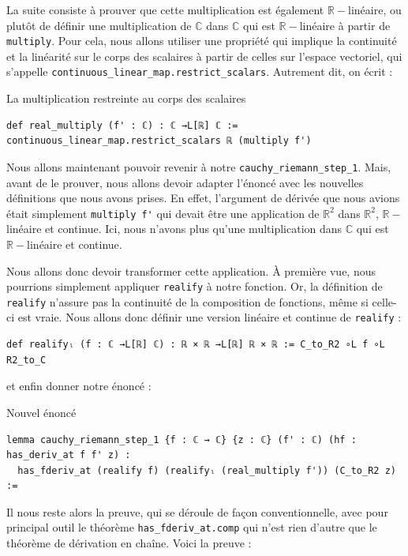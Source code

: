\documentclass[a4paper, 11pt, twoside]{report}
\newcommand\R{\mathbb{R}}
\newcommand\C{\mathbb{C}}
\begin{document}
La suite consiste à prouver que cette multiplication est également $\R-$linéaire, ou plutôt de définir une multiplication de $\C$ dans $\C$ qui est $\R-$linéaire à partir de \verb|multiply|. Pour cela, nous allons utiliser une propriété qui implique la continuité et la linéarité sur le corps des scalaires à partir de celles sur l'espace vectoriel, qui s'appelle \verb|continuous_linear_map.restrict_scalars|. Autrement dit, on écrit :

\begin{code}{La multiplication restreinte au corps des scalaires}
\begin{lstlisting}
def real_multiply (f' : ℂ) : ℂ →L[ℝ] ℂ :=
continuous_linear_map.restrict_scalars ℝ (multiply f')
\end{lstlisting}
\end{code}

\bigskip

Nous allons maintenant pouvoir revenir à notre \verb|cauchy_riemann_step_1|. Mais, avant de le prouver, nous allons devoir adapter l'énoncé avec les nouvelles définitions que nous avons prises. En effet, l'argument de dérivée que nous avions était simplement \verb|multiply f'| qui devait être une application de $\R^2$ dans $\R^2$, $\R-$linéaire et continue. Ici, nous n'avons plus qu'une multiplication dans $\C$ qui est $\R-$linéaire et continue.

Nous allons donc devoir transformer cette application. À première vue, nous pourrions simplement appliquer \verb|realify| à notre fonction. Or, la définition de \verb|realify| n'assure pas la continuité de la composition de fonctions, même si celle-ci est vraie. Nous allons donc définir une version linéaire et continue de \verb|realify| :

\begin{lstlisting}
def realifyₗ (f : ℂ →L[ℝ] ℂ) : ℝ × ℝ →L[ℝ] ℝ × ℝ := C_to_R2 ∘L f ∘L R2_to_C
\end{lstlisting}

et enfin donner notre énoncé :

\begin{code}{Nouvel énoncé}
\begin{lstlisting}
lemma cauchy_riemann_step_1 {f : ℂ → ℂ} {z : ℂ} (f' : ℂ) (hf : has_deriv_at f f' z) : 
  has_fderiv_at (realify f) (realifyₗ (real_multiply f')) (C_to_R2 z) := 
\end{lstlisting}
\end{code}

Il nous reste alors la preuve, qui se déroule de façon conventionnelle, avec pour principal outil le théorème \verb|has_fderiv_at.comp| qui n'est rien d'autre que le théorème de dérivation en chaîne. Voici la preuve :
\end{document}
